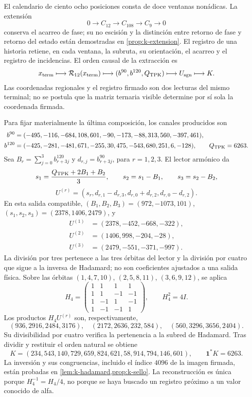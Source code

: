 El calendario de ciento ocho posiciones consta de doce ventanas nonádicas.
La extensión
\[
 0\longrightarrow C_{12}\longrightarrow C_{108}
 \longrightarrow C_9\longrightarrow0
\]
conserva el acarreo de fase; su no escisión y la distinción entre retorno de
fase y retorno del estado están demostradas en
\cref{prop:k-extension}. El registro de una historia retiene, en cada
ventana, la subruta, su orientación, el acarreo y el registro de incidencias.
El orden causal de la extracción es
\begin{equation}
 x_{\rm term}\longmapsto\mathcal R_{12}(x_{\rm term})
 \longmapsto(b^{90},b^{120},Q_{\rm TPK})
 \longmapsto U_{\rm sgn}\longmapsto K.
 \label{lib01:cadena-registro}
\end{equation}
Las coordenadas regionales y el registro firmado son dos lecturas del
mismo terminal; no se postula que la matriz ternaria visible determine por
sí sola la coordenada firmada.

Para fijar materialmente la última composición, los canales producidos son
\begin{align*}
 b^{90}&=(-495,-116,-684,108,601,-90,
                -173,-88,313,560,-397,461),\\
 b^{120}&=(-425,-281,-481,671,-255,30,
                 475,-543,680,251,6,-128),\qquad Q_{\rm TPK}=6263.
\end{align*}
Sea \(B_r=\sum_{j=0}^3b^{120}_{r+3j}\) y
\(d_{r,j}=b^{90}_{r+3j}\), para \(r=1,2,3\). El lector armónico da
\[
 s_1=\frac{Q_{\rm TPK}+2B_1+B_2}{3},\qquad
 s_2=s_1-B_1,\qquad s_3=s_2-B_2,
\]
\[
 U^{(r)}=(s_r,d_{r,1}-d_{r,3},d_{r,0}+d_{r,2},d_{r,0}-d_{r,2}).
\]
En esta salida compatible, \((B_1,B_2,B_3)=(972,-1073,101)\),
\((s_1,s_2,s_3)=(2378,1406,2479)\), y
\begin{align*}
 U^{(1)}&=(2378,-452,-668,-322),\\
 U^{(2)}&=(1406,998,-204,-28),\\
 U^{(3)}&=(2479,-551,-371,-997).
\end{align*}
La división por tres pertenece a las tres órbitas del lector y la división
por cuatro que sigue a la inversa de Hadamard; no son coeficientes ajustados
a una salida física. Sobre las órbitas
\((1,4,7,10)\), \((2,5,8,11)\), \((3,6,9,12)\), se aplica
\[
 H_4=\begin{pmatrix}
 1&1&1&1\\1&1&-1&-1\\1&-1&1&-1\\1&-1&-1&1
 \end{pmatrix},\qquad H_4^2=4I.
\]
Los productos \(H_4U^{(r)}\) son, respectivamente,
\[
 (936,2916,2484,3176),\quad(2172,2636,232,584),
 \quad(560,3296,3656,2404).
\]
Su divisibilidad por cuatro verifica la pertenencia a la subred de
Hadamard. Tras dividir y restituir el orden natural se obtiene
\begin{equation}
 K=(234,543,140,729,659,824,621,58,914,794,146,601),
 \qquad\mathbf1^*K=6263.
 \label{lib01:K}
\end{equation}
La inversión y sus congruencias, incluido el índice \(4096\) de la imagen
firmada, están probadas en \cref{lem:k-hadamard,prop:k-sello}. La
reconstrucción es única porque \(H_4^{-1}=H_4/4\), no porque se haya
buscado un registro próximo a un valor conocido de alfa.

